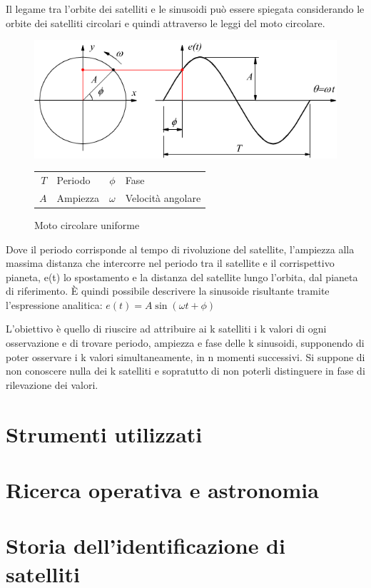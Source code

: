 \documentclass[a4paper,12pt]{report}
\begin{document}
Il legame tra l'orbite dei satelliti e le sinusoidi può essere spiegata considerando le orbite dei satelliti circolari e quindi attraverso le leggi del moto circolare.
\begin{figure}[H]
  \caption{Moto circolare uniforme}
  \begin{center}
  \includegraphics[scale=0.50]{img/sinusoide_cerchio.png}
  \begin{tabular}{r@{: }l r@{: }l}
  $T$ & Periodo & $\phi$ & Fase \\
  $A$ & Ampiezza & $\omega$ & Velocità angolare
  \end{tabular}
  \end{center}
\end{figure}


Dove il periodo corrisponde al tempo di rivoluzione del satellite, l'ampiezza alla massima distanza che intercorre nel periodo tra il satellite e il corrispettivo pianeta, e(t) lo spostamento e la distanza del satellite lungo l'orbita, dal pianeta di riferimento.
È quindi possibile descrivere la sinusoide risultante tramite l'espressione analitica:
$ e(t) = A\sin(\omega t + \phi)$



L'obiettivo è quello di riuscire ad attribuire ai k satelliti i k valori di
ogni osservazione e di trovare periodo, ampiezza e fase delle k sinusoidi,
supponendo di poter osservare i k valori simultaneamente, in n momenti
successivi. Si suppone di non conoscere nulla dei k satelliti e sopratutto di non poterli distinguere in fase di rilevazione dei valori.
\section{Strumenti utilizzati}
\section{Ricerca operativa e astronomia}
\section{Storia dell'identificazione di satelliti}
\end{document}
